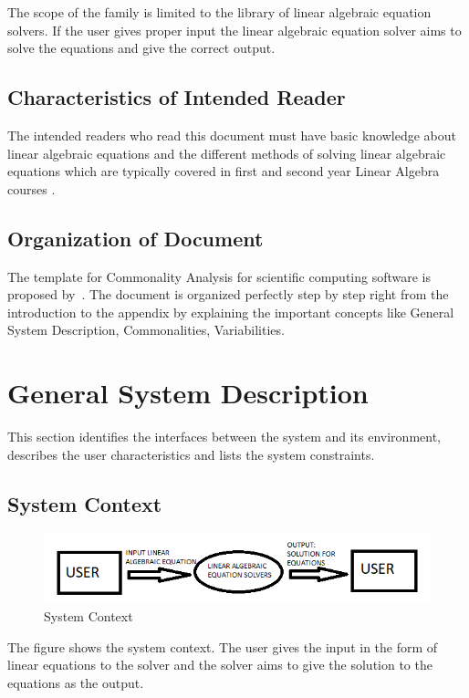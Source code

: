 \documentclass[12pt]{article}
\begin{document}
The scope of the family is limited to the library of linear algebraic equation
solvers. If the user gives proper input the linear algebraic equation solver
aims to solve the equations and give the correct output.

\subsection{Characteristics of Intended Reader} 

The intended readers who read this document must have basic knowledge about
linear algebraic equations and the different methods of solving linear algebraic
equations which are typically covered in first and second year Linear Algebra courses .


\subsection{Organization of Document}

The template for Commonality Analysis for scientific computing software is
proposed by~\cite{smith2006systematic}. The document is organized perfectly step
by step right from the introduction to the appendix by explaining the important
concepts like General System Description, Commonalities, Variabilities.

\section{General System Description}

This section identifies the interfaces between the system and its environment,
describes the user characteristics and lists the system constraints.

\subsection{System Context}

\begin{figure}[h]
\centering
\includegraphics[scale= .7]{diagram1}
\caption{System Context}
\end{figure}

The figure shows the system context. The user gives the input in the form of
linear equations to the solver and the solver aims to give the solution to the
equations as the output.
\end{document}
